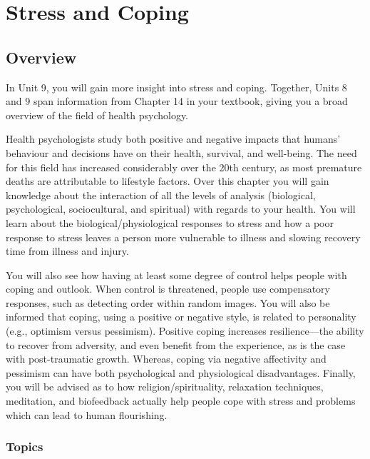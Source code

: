 \documentclass[
]{book}
\begin{document}
\hypertarget{stress-and-coping}{%
\chapter{Stress and Coping}\label{stress-and-coping}}

\hypertarget{overview-8}{%
\section*{Overview}\label{overview-8}}

In Unit 9, you will gain more insight into stress and coping. Together, Units 8 and 9 span information from Chapter 14 in your textbook, giving you a broad overview of the field of health psychology.

Health psychologists study both positive and negative impacts that humans' behaviour and decisions have on their health, survival, and well-being. The need for this field has increased considerably over the 20th century, as most premature deaths are attributable to lifestyle factors. Over this chapter you will gain knowledge about the interaction of all the levels of analysis (biological, psychological, sociocultural, and spiritual) with regards to your health. You will learn about the biological/physiological responses to stress and how a poor response to stress leaves a person more vulnerable to illness and slowing recovery time from illness and injury.

You will also see how having at least some degree of control helps people with coping and outlook. When control is threatened, people use compensatory responses, such as detecting order within random images. You will also be informed that coping, using a positive or negative style, is related to personality (e.g., optimism versus pessimism). Positive coping increases resilience---the ability to recover from adversity, and even benefit from the experience, as is the case with post-traumatic growth. Whereas, coping via negative affectivity and pessimism can have both psychological and physiological disadvantages. Finally, you will be advised as to how religion/spirituality, relaxation techniques, meditation, and biofeedback actually help people cope with stress and problems which can lead to human flourishing.

\hypertarget{topics-8}{%
\subsection*{Topics}\label{topics-8}}
\end{document}
